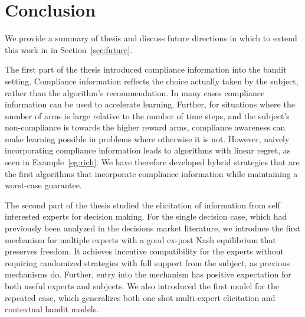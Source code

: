 \chapter{Conclusion}
\label{cha:conc}

We provide a summary of thesis and discuss future directions in which to extend this work in in Section~\ref{sec:future}.


The first part of the thesis introduced compliance information into the bandit setting. 
Compliance information reflects the choice actually taken by the subject, rather than the algorithm's recommendation. 
In many cases compliance information can be used to accelerate learning.
Further, for situations where the number of arms is large relative to the number of time steps, and the subject's non-compliance is towards the higher reward arms, compliance awareness can make learning possible in problems where otherwise it is not. 
However, naively incorporating compliance information leads to algorithms with linear regret, as seen in Example~\ref{eg:rich}. 
We have therefore developed hybrid strategies that are the first algorithms that incorporate compliance information while maintaining a worst-case guarantee. 

The second part of the thesis studied the elicitation of information from self interested experts for decision making.
For the single decision case, which had previously been analyzed in the decisions market literature, we introduce the first mechanism for multiple experts with a good ex-post Nash equilibrium that preserves freedom.
It achieves incentive compatibility for the experts without requiring randomized strategies with full support from the subject, as previous mechanisms do. Further, entry into the mechanism has positive expectation for both useful experts and subjects.
We also introduced the first model for the repeated case, which generalizes both one shot multi-expert elicitation and contextual bandit models.



